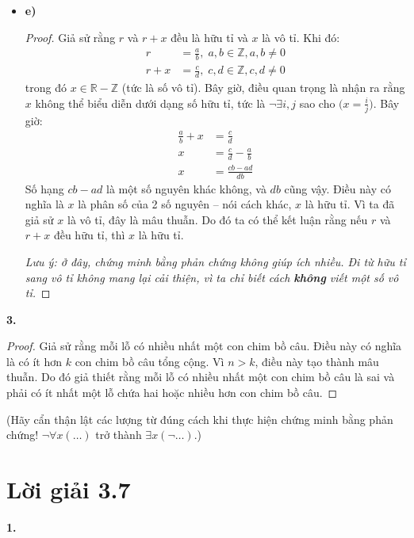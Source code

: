 \documentclass[12pt,a4paper]{article}
\theoremstyle{definition}
\begin{document}
\begin{itemize}
\item \textbf{e)}
\begin{proof}
Giả sử rằng $r$ và $r + x$ đều là hữu tỉ và $x$ là vô tỉ. Khi đó:
\begin{align}
r &= \frac{a}{b},\; a, b \in \mathbb{Z}, a, b \neq 0 \\
r + x &= \frac{c}{d},\; c, d \in \mathbb{Z}, c, d \neq 0
\end{align}
trong đó $x \in \mathbb{R} - \mathbb{Z}$ (tức là số vô tỉ). Bây giờ, điều quan trọng là nhận ra rằng $x$ không thể biểu diễn dưới dạng số hữu tỉ, tức là $\neg\exists i, j$ sao cho $\big(x = \frac{i}{j}\big)$. Bây giờ:
\begin{align}
\frac{a}{b} + x &= \frac{c}{d} \\
x &= \frac{c}{d} - \frac{a}{b} \\
x &= \frac{cb - ad}{db}
\end{align}
Số hạng $cb - ad$ là một số nguyên khác không, và $db$ cũng vậy. Điều này có nghĩa là $x$ là phân số của 2 số nguyên -- nói cách khác, $x$ là hữu tỉ. Vì ta đã giả sử $x$ là vô tỉ, đây là mâu thuẫn. Do đó ta có thể kết luận rằng nếu $r$ và $r + x$ đều hữu tỉ, thì $x$ là hữu tỉ.

\textit{Lưu ý: ở đây, chứng minh bằng phản chứng không giúp ích nhiều. Đi từ hữu tỉ sang vô tỉ không mang lại cải thiện, vì ta chỉ biết cách \textbf{không} viết một số vô tỉ.}
\end{proof}
\end{itemize}

\bigskip
\textbf{3.}

\begin{proof}
Giả sử rằng mỗi lỗ có nhiều nhất một con chim bồ câu. Điều này có nghĩa là có ít hơn $k$ con chim bồ câu tổng cộng. Vì $n > k$, điều này tạo thành mâu thuẫn. Do đó giả thiết rằng mỗi lỗ có nhiều nhất một con chim bồ câu là sai và phải có ít nhất một lỗ chứa hai hoặc nhiều hơn con chim bồ câu.
\end{proof}

(Hãy cẩn thận lật các lượng từ đúng cách khi thực hiện chứng minh bằng phản chứng! $\neg\forall x(\ldots)$ trở thành $\exists x(\neg \ldots)$.)

\section*{Lời giải 3.7}

\textbf{1.}
\end{document}

